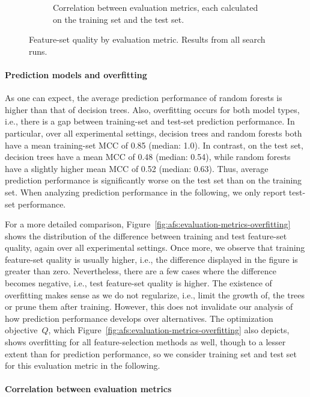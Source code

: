 \documentclass{article}
\theoremstyle{definition}
\begin{document}
\begin{figure}[htb]
\begin{subfigure}[t]{0.48\textwidth}
		\caption{Correlation between evaluation metrics, each calculated on the training set and the test set.}
		\label{fig:afs:evaluation-metrics-correlation}
	\end{subfigure}
	\caption{
		Feature-set quality by evaluation metric.
		Results from all search runs.
	}
	\label{fig:afs:evaluation-metrics}
\end{figure}

\paragraph{Prediction models and overfitting}

As one can expect, the average prediction performance of random forests is higher than that of decision trees.
Also, overfitting occurs for both model types, i.e., there is a gap between training-set and test-set prediction performance.
In particular, over all experimental settings, decision trees and random forests both have a mean training-set MCC of 0.85 (median: 1.0).
In contrast, on the test set, decision trees have a mean MCC of 0.48 (median: 0.54), while random forests have a slightly higher mean MCC of 0.52 (median: 0.63).
Thus, average prediction performance is significantly worse on the test set than on the training set.
When analyzing prediction performance in the following, we only report test-set performance.

For a more detailed comparison, Figure~\ref{fig:afs:evaluation-metrics-overfitting} shows the distribution of the difference between training and test feature-set quality, again over all experimental settings.
Once more, we observe that training feature-set quality is usually higher, i.e., the difference displayed in the figure is greater than zero.
Nevertheless, there are a few cases where the difference becomes negative, i.e., test feature-set quality is higher.
The existence of overfitting makes sense as we do not regularize, i.e., limit the growth of, the trees or prune them after training.
However, this does not invalidate our analysis of how prediction performance develops over alternatives.
The optimization objective~$Q$, which Figure~\ref{fig:afs:evaluation-metrics-overfitting} also depicts, shows overfitting for all feature-selection methods as well, though to a lesser extent than for prediction performance, so we consider training set and test set for this evaluation metric in the following.

\paragraph{Correlation between evaluation metrics}
\end{document}

